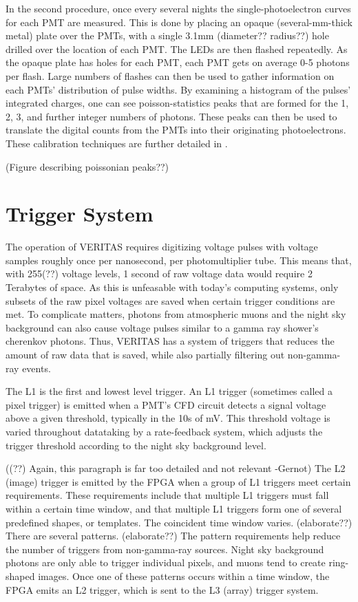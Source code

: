 In the second procedure, once every several nights the single-photoelectron curves for each PMT are measured.
This is done by placing an opaque (several-mm-thick metal) plate over the PMTs, with a single 3.1mm {\color{red}(diameter?? radius??)} hole drilled over the location of each PMT.
The LEDs are then flashed repeatedly.
As the opaque plate has holes for each PMT, each PMT gets on average 0-5 photons per flash.
Large numbers of flashes can then be used to gather information on each PMTs' distribution of pulse widths.
By examining a histogram of the pulses' integrated charges, one can see poisson-statistics peaks that are formed for the 1, 2, 3, and further integer numbers of photons.
These peaks can then be used to translate the digital counts from the PMTs into their originating photoelectrons.
These calibration techniques are further detailed in \cite{calib_techniques}.

{\color{red}(Figure describing poissonian peaks??)}



\section{Trigger System}\label{sec:trig}

The operation of VERITAS requires digitizing voltage pulses with voltage samples roughly once per nanosecond, per photomultiplier tube.
This means that, with 255{\color{red}(??)} voltage levels, 1 second of raw voltage data would require 2 Terabytes of space.
As this is unfeasable with today's computing systems, only subsets of the raw pixel voltages are saved when certain trigger conditions are met.
To complicate matters, photons from atmospheric muons and the night sky background can also cause voltage pulses similar to a gamma ray shower's cherenkov photons.
Thus, VERITAS has a system of triggers that reduces the amount of raw data that is saved, while also partially filtering out non-gamma-ray events.

The L1 is the first and lowest level trigger.
An L1 trigger (sometimes called a pixel trigger) is emitted when a PMT's CFD circuit detects a signal voltage above a given threshold, typically in the 10s of mV.
This threshold voltage is varied throughout datataking by a rate-feedback system, which adjusts the trigger threshold according to the night sky background level.

{\color{red}((??) Again, this paragraph is far too detailed and not relevant -Gernot)}
The L2 (image) trigger is emitted by the FPGA when a group of L1 triggers meet certain requirements.
These requirements include that multiple L1 triggers must fall within a certain time window, and that multiple L1 triggers form one of several predefined shapes, or templates.
The coincident time window varies. {\color{red}(elaborate??)}
There are several patterns. {\color{red}(elaborate??)}
The pattern requirements help reduce the number of triggers from non-gamma-ray sources.
Night sky background photons are only able to trigger individual pixels, and muons tend to create ring-shaped images.
Once one of these patterns occurs within a time window, the FPGA emits an L2 trigger, which is sent to the L3 (array) trigger system.

